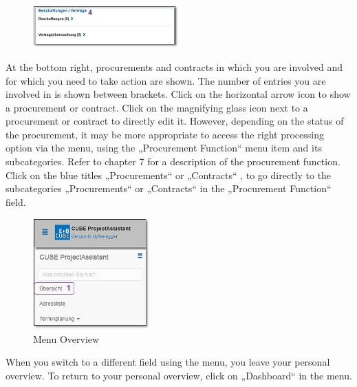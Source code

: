 \begin{figure}
  \vspace{-20pt}
  \begin{center}
    \includegraphics[width=0.5\textwidth]{../chapters/01_Einfuehrung/pictures/1-3-2_persUebersichtBeschaffung.jpg}
  \end{center}
  \vspace{-20pt}
  \vspace{-10pt}
\end{figure}
At the bottom right, procurements and contracts  in which you are involved and for which you need to take action are shown. The number of entries you are involved in is shown between brackets. Click on the horizontal arrow icon to show a procurement or contract. Click on the magnifying glass icon next to a procurement or contract to directly edit it. However, depending on the status of the procurement, it may be more appropriate to access the right processing option via the menu, using the „Procurement Function“ menu item and its subcategories. Refer to chapter 7 for a description of the procurement function. Click on the blue titles „Procurements“ or „Contracts“ , to go directly to the subcategories „Procurements“ or „Contracts“ in the „Procurement Function“ field.

\vspace{\baselineskip}

\begin{figure}
  \vspace{-30pt}
  \begin{center}
    \includegraphics[width=0.4\textwidth]{../chapters/01_Einfuehrung/pictures/1-3-2_MenuepunktUebersicht.jpg}
  \end{center}
  \vspace{-20pt}
  \caption{Menu Overview}
  \vspace{-10pt}
\end{figure}
When you switch to a different field using the menu, you leave your personal overview. To return to your personal overview, click on „Dashboard“  in the menu.

